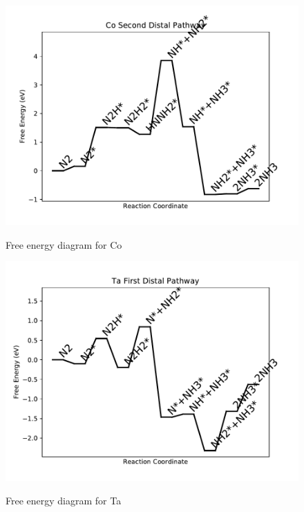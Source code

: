 \documentclass{article}
\begin{document}
\newpage
\begin{figure}
\includegraphics[width=1\linewidth]{data/plots/Co_distal_2.pdf}
\label{fig:Co_distal_2}
\caption{Free energy diagram for Co}
\end{figure}

\begin{figure}
\includegraphics[width=1\linewidth]{data/plots/Ta_distal_1.pdf}
\label{fig:Ta_distal_1}
\caption{Free energy diagram for Ta}
\end{figure}
\end{document}
